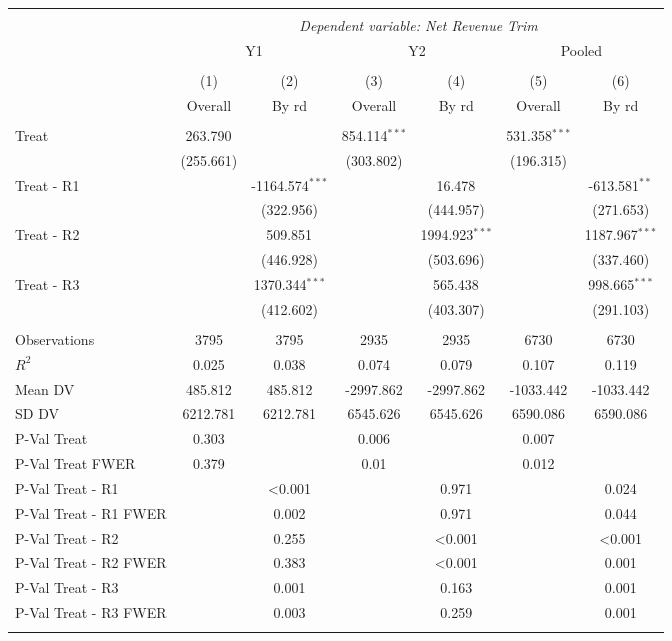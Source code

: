
\begin{tabular}{@{\extracolsep{5pt}}lcccccc}
\\[-1.8ex]\hline
\hline \\[-1.8ex]
& \multicolumn{6}{c}{\textit{Dependent variable: Net Revenue Trim}} \
\cr \cline{2-7}
\\[-1.8ex] & \multicolumn{2}{c}{Y1} & \multicolumn{2}{c}{Y2} & \multicolumn{2}{c}{Pooled}  \\
\\[-1.8ex] & (1) & (2) & (3) & (4) & (5) & (6) 
 \\ & Overall & By rd & Overall & By rd & Overall & By rd \\
\hline \\[-1.8ex]
 Treat & 263.790$^{}$ & & 854.114$^{***}$ & & 531.358$^{***}$ & \\
& (255.661) & & (303.802) & & (196.315) & \\
 Treat - R1 & & -1164.574$^{***}$ & & 16.478$^{}$ & & -613.581$^{**}$ \\
& & (322.956) & & (444.957) & & (271.653) \\
 Treat - R2 & & 509.851$^{}$ & & 1994.923$^{***}$ & & 1187.967$^{***}$ \\
& & (446.928) & & (503.696) & & (337.460) \\
 Treat - R3 & & 1370.344$^{***}$ & & 565.438$^{}$ & & 998.665$^{***}$ \\
& & (412.602) & & (403.307) & & (291.103) \\
\hline \\[-1.8ex]
 Observations & 3795 & 3795 & 2935 & 2935 & 6730 & 6730 \\
 $R^2$ & 0.025 & 0.038 & 0.074 & 0.079 & 0.107 & 0.119 \\
 Mean DV & 485.812 & 485.812 & -2997.862 & -2997.862 & -1033.442 & -1033.442 \\
 SD DV & 6212.781 & 6212.781 & 6545.626 & 6545.626 & 6590.086 & 6590.086 \\
 P-Val Treat & 0.303 &  & 0.006 &  & 0.007 &  \\
 P-Val Treat FWER & 0.379 &  & 0.01 &  & 0.012 &  \\
 P-Val Treat - R1 &  & <0.001 &  & 0.971 &  & 0.024 \\
 P-Val Treat - R1 FWER &  & 0.002 &  & 0.971 &  & 0.044 \\
 P-Val Treat - R2 &  & 0.255 &  & <0.001 &  & <0.001 \\
 P-Val Treat - R2 FWER &  & 0.383 &  & <0.001 &  & 0.001 \\
 P-Val Treat - R3 &  & 0.001 &  & 0.163 &  & 0.001 \\
 P-Val Treat - R3 FWER &  & 0.003 &  & 0.259 &  & 0.001 \\
\hline
\hline \\[-1.8ex]
\end{tabular}
